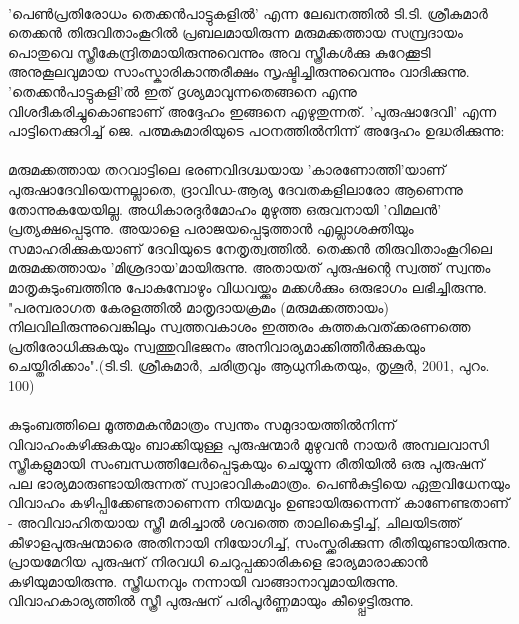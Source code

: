 \label{ch2box3} %
\begin{tcolorbox}[%
  breakable, %
  arc=0mm, 
  left=1pt, right = 1pt, 
  boxrule=0mm,
  colback = {blue!10}, %
] 

\paragraph{}'പെൺപ്രതിരോധം തെക്കൻപാട്ടുകളിൽ' എന്ന ലേഖനത്തിൽ ടി.ടി. ശ്രീകുമാർ തെക്കൻ തിരുവിതാംകൂറിൽ പ്രബലമായിരുന്ന മരുമക്കത്തായ സമ്പ്രദായം പൊതുവെ സ്ത്രീകേന്ദ്രിതമായിരുന്നുവെന്നും അവ സ്ത്രീകൾക്കു കുറേക്കൂടി അനുകൂലവുമായ സാംസ്കാരികാന്തരീക്ഷം സൃഷ്ടിച്ചിരുന്നുവെന്നും വാദിക്കുന്നു. 'തെക്കൻപാട്ടുകളി'ൽ ഇത് ദൃശ്യമാവുന്നതെങ്ങനെ എന്നു വിശദീകരിച്ചുകൊണ്ടാണ് അദ്ദേഹം ഇങ്ങനെ എഴുതുന്നത്. 'പുരുഷാദേവി' എന്ന പാട്ടിനെക്കുറിച്ച് ജെ. പത്മകുമാരിയുടെ പഠനത്തിൽനിന്ന് അദ്ദേഹം ഉദ്ധരിക്കുന്നു:

\paragraph{}
 മരുമക്കത്തായ തറവാട്ടിലെ ഭരണവിദഗ്ദ്ധയായ 'കാരണോത്തി'യാണ് പുരുഷാദേവിയെന്നല്ലാതെ, ദ്രാവിഡ-ആര്യ ദേവതകളിലാരോ ആണെന്നു തോന്നുകയേയില്ല. അധികാരദുർമോഹം മുഴുത്ത ഒരുവനായി 'വിമലൻ' പ്രത്യക്ഷപ്പെടുന്നു. അയാളെ പരാജയപ്പെടുത്താൻ എല്ലാശക്തിയും സമാഹരിക്കുകയാണ് ദേവിയുടെ നേതൃത്വത്തിൽ. തെക്കൻ തിരുവിതാംകൂറിലെ മരുമക്കത്തായം 'മിശ്രദായ'മായിരുന്നു. അതായത് പുരുഷന്റെ സ്വത്ത് സ്വന്തം മാതൃകുടുംബത്തിനു പോകുമ്പോഴും വിധവയ്ക്കും മക്കൾക്കും ഒരുഭാഗം ലഭിച്ചിരുന്നു. "പരമ്പരാഗത കേരളത്തിൽ മാതൃദായക്രമം (മരുമക്കത്തായം) നിലവിലിരുന്നുവെങ്കിലും സ്വത്തവകാശം ഇത്തരം കുത്തകവത്ക്കരണത്തെ പ്രതിരോധിക്കുകയും സ്വത്തുവിഭജനം അനിവാര്യമാക്കിത്തീർക്കുകയും ചെയ്തിരിക്കാം".(ടി.ടി. ശ്രീകുമാർ, ചരിത്രവും ആധുനികതയും, തൃശൂർ, 2001, പുറം. 100)
\end{tcolorbox}

\paragraph{}കുടുംബത്തിലെ മൂത്തമകൻമാത്രം സ്വന്തം സമുദായത്തിൽനിന്ന് വിവാഹംകഴിക്കുകയും ബാക്കിയുള്ള പുരുഷന്മാർ മുഴുവൻ നായർ അമ്പലവാസി സ്ത്രീകളുമായി സംബന്ധത്തിലേർപ്പെടുകയും ചെയ്യുന്ന രീതിയിൽ ഒരു പുരുഷന് പല ഭാര്യമാരുണ്ടായിരുന്നത് സ്വാഭാവികംമാത്രം. പെൺകുട്ടിയെ ഏതുവിധേനയും വിവാഹം കഴിപ്പിക്കേണ്ടതാണെന്ന നിയമവും ഉണ്ടായിരുന്നെന്ന് കാണേണ്ടതാണ് - അവിവാഹിതയായ സ്ത്രീ മരിച്ചാൽ ശവത്തെ താലികെട്ടിച്ച്, ചിലയിടത്ത് കീഴാളപുരുഷന്മാരെ അതിനായി നിയോഗിച്ച്, സംസ്ക്കരിക്കുന്ന രീതിയുണ്ടായിരുന്നു. പ്രായമേറിയ പുരുഷന് നിരവധി ചെറുപ്പക്കാരികളെ ഭാര്യമാരാക്കാൻ കഴിയുമായിരുന്നു. സ്ത്രീധനവും നന്നായി വാങ്ങാനാവുമായിരുന്നു. വിവാഹകാര്യത്തിൽ സ്ത്രീ പുരുഷന് പരിപൂർണ്ണമായും കീഴ്പ്പെട്ടിരുന്നു.

